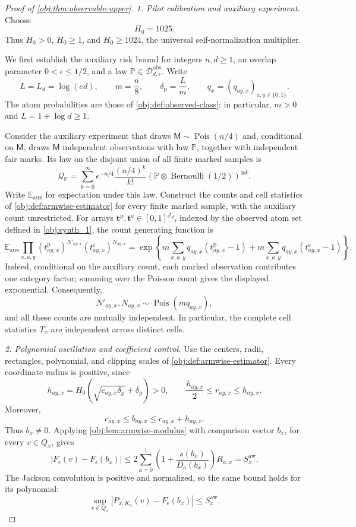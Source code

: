 \documentclass[11pt]{article}
\begin{document}
\begin{proof}[Proof of \cref{obj:thm:observable-upper}]
\textit{1. Pilot calibration and auxiliary experiment.}
Choose
\[
H_0=1025.
\]
Thus \(H_0>0\), \(H_0\ge1\), and \(H_0\ge1024\), the universal self-normalization multiplier.

We first establish the auxiliary risk bound for integers \(n,d\ge1\), an overlap parameter \(0<\epsilon\le1/2\), and a law \(\mathbb P\in\mathcal D_{d,\epsilon}^{\mathrm{obs}}\). Write
\[
L=L_d=\log(ed),\qquad m=\frac n8,\qquad
\delta_{\mathrm p}=\frac Lm,\qquad
q_x=(q_{ay,x})_{a,y\in\{0,1\}}.
\]
The atom probabilities are those of \cref{obj:def:observed-class}; in particular, \(m>0\) and \(L=1+\log d\ge1\).

Consider the auxiliary experiment that draws \(\mathsf M\sim\operatorname{Pois}(n/4)\) and, conditional on \(\mathsf M\), draws \(\mathsf M\) independent observations with law \(\mathbb P\), together with independent fair marks. Its law on the disjoint union of all finite marked samples is
\[
\mathcal Q_{\mathbb P}
=
\sum_{k=0}^{\infty}
e^{-n/4}\frac{(n/4)^k}{k!}
\left(\mathbb P\otimes\operatorname{Bernoulli}(1/2)\right)^{\otimes k}.
\]
Write \(\mathbb E_{\mathrm{aux}}\) for expectation under this law. Construct the counts and cell statistics of \cref{obj:def:armwise-estimator} for every finite marked sample, with the auxiliary count unrestricted. For arrays
\(\boldsymbol t^{\mathrm p},\boldsymbol t^{\mathrm e}\in[0,1]^{\mathcal J_d}\), indexed by the observed atom set defined in \cref{obj:synth_1}, the count generating function is
\[
\mathbb E_{\mathrm{aux}}
\prod_{x,a,y}
(t^{\mathrm p}_{ay,x})^{N'_{ay,x}}
(t^{\mathrm e}_{ay,x})^{N_{ay,x}}
=
\exp\left\{
m\sum_{x,a,y}q_{ay,x}(t^{\mathrm p}_{ay,x}-1)
+
m\sum_{x,a,y}q_{ay,x}(t^{\mathrm e}_{ay,x}-1)
\right\}.
\]
Indeed, conditional on the auxiliary count, each marked observation contributes one category factor; summing over the Poisson count gives the displayed exponential. Consequently,
\[
N'_{ay,x},N_{ay,x}\sim\operatorname{Pois}(mq_{ay,x}),
\]
and all these counts are mutually independent. In particular, the complete cell statistics \(T_x\) are independent across distinct cells.

\textit{2. Polynomial oscillation and coefficient control.}
Use the centers, radii, rectangles, polynomial, and clipping scales of \cref{obj:def:armwise-estimator}. Every coordinate radius is positive, since
\[
h_{ay,x}=H_0\left(\sqrt{c_{ay,x}\delta_{\mathrm p}}+\delta_{\mathrm p}\right)>0,
\qquad
\frac{h_{ay,x}}2\le r_{ay,x}\le h_{ay,x}.
\]
Moreover,
\[
c_{ay,x}\le b_{ay,x}\le c_{ay,x}+h_{ay,x}.
\]
Thus \(b_x\ne0\). Applying \cref{obj:lem:armwise-modulus} with comparison vector \(b_x\), for every \(v\in Q_x\), gives
\[
|F_\epsilon(v)-F_\epsilon(b_x)|
\le
2\sum_{a=0}^1
\left(1+\frac{s(b_x)}{D_a(b_x)}\right)R_{a,x}
=S_x^{\mathrm{aw}}.
\]
The Jackson convolution is positive and normalized, so the same bound holds for its polynomial:
\[
\sup_{v\in Q_x}
|P_{x,K_n}(v)-F_\epsilon(b_x)|
\le S_x^{\mathrm{aw}}.
\]


\end{proof}
\end{document}
